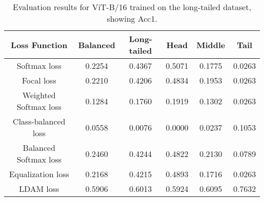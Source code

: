 \begin{table}[H]
    \centering
    \begin{tabular}{cccccc}
        \toprule
        Loss Function & Balanced & Long-tailed & Head & Middle & Tail \\ 
        \midrule
        Softmax loss   & 0.2254 & 0.4367 & 0.5071 & 0.1775 & 0.0263 \\
        Focal loss   & 0.2210 & 0.4206 & 0.4834 & 0.1953 & 0.0263 \\
        Weighted Softmax loss   & 0.1284 & 0.1760 & 0.1919 & 0.1302 & 0.0263 \\
        Class-balanced loss   & 0.0558 & 0.0076 & 0.0000 & 0.0237 & 0.1053 \\
        Balanced Softmax loss   & 0.2460 & 0.4244 & 0.4822 &  0.2130 & 0.0789 \\
        Equalization loss   & 0.2168 & 0.4215 & 0.4893 & 0.1716 & 0.0263 \\
        LDAM loss   & 0.5906 & 0.6013 & 0.5924 & 0.6095 & 0.7632 \\
        \bottomrule
    \end{tabular}
    \caption{Evaluation results for ViT-B/16 trained on the long-tailed dataset, showing Acc1.}
    \label{tab:vil_lt_acc1}
\end{table}


